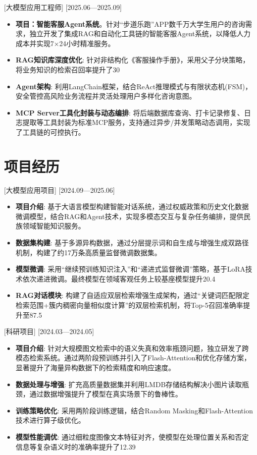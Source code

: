 \documentclass{resume}
\begin{document}
[大模型应用工程师]
[2025.06—2025.09]

\begin{itemize}
  \item \textbf{项目：智能客服Agent系统}。针对“步道乐跑”APP数千万大学生用户的咨询需求，独立开发了集成RAG和自动化工具链的智能客服Agent系统，以降低人力成本并实现7×24小时精准服务。
  \item \textbf{RAG知识库深度优化}: 针对非结构化《客服操作手册》，采用父子分块策略，将业务知识的检索召回率提升了30%
  \item \textbf{Agent架构}: 利用LangChain框架，结合ReAct推理模式与有限状态机(FSM)，安全管控高风险业务流程并灵活处理用户多样化咨询意图。
  \item \textbf{MCP Server工具化封装与动态编排}: 将后端数据库查询、打卡记录修复、日志提取等工具封装为标准MCP服务，支持通过异步/并发策略动态调用，实现了工具链的可控执行。
\end{itemize}

\section{项目经历}

[大模型应用项目]
[2024.09—2025.06]
\begin{itemize}
  \item \textbf{项目介绍}: 基于大语言模型构建智能对话系统，通过权威政策和历史文化数据微调模型，结合RAG和Agent技术，实现多模态交互与复杂任务编排，提供民族领域智能知识服务。
  \item \textbf{数据集构建}: 基于多源异构数据，通过分层提示词和自生成与增强生成双路径机制，构建了约17万条高质量监督微调数据集。
  \item \textbf{模型微调}: 采用“继续预训练知识注入”和“递进式监督微调”策略，基于LoRA技术依次递进微调。最终模型在领域客观任务上较基座模型提升20.4%
  \item \textbf{RAG对话模块}: 构建了自适应双层检索增强生成架构，通过“关键词匹配限定检索范围+簇内稠密向量相似度计算”的双层检索机制，将Top-5召回准确率提升至87.5%
\end{itemize}

[科研项目]
[2024.03—2024.05]
\begin{itemize}
  \item \textbf{项目介绍}: 针对大规模图文检索中的语义失真和效率瓶颈问题，独立研发了跨模态检索系统。通过两阶段预训练并引入了Flash-Attention和优化存储方案，显著提升了海量异构数据下的检索精度和响应速度。
  \item \textbf{数据处理与增强}: 扩充高质量数据集并利用LMDB存储结构解决小图片读取瓶颈，通过数据增强提升了模型在真实场景下的鲁棒性。
  \item \textbf{训练策略优化}: 采用两阶段训练逻辑，结合Random Masking和Flash-Attention技术进行算子级优化。
  \item \textbf{模型性能调优}: 通过细粒度图像文本特征对齐，使模型在处理位置关系和否定信息等复杂语义时的准确率提升了12.39%
\end{itemize}
\end{document}
